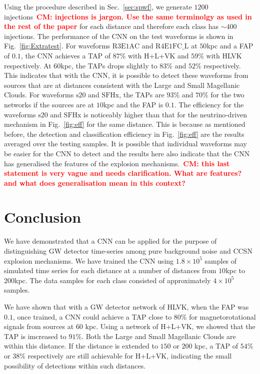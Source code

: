 \documentclass[aps,twocolumn,showpacs,groupedaddress, nofootinbib]{revtex4}  %
\newcommand{\cm}[1]{\textbf{\textcolor{red}{CM: #1}}}
\begin{document}
%
%
Using the procedure described in Sec.~\ref{sec:spwf}, we generate $1200$
injections~\cm{injections is jargon. Use the same terminolgy as used in the
rest of the paper} for each distance and therefore each class has $\sim 400$
injections. The performance of the \ac{CNN} on the test waveforms is shown in
Fig.~\ref{fig:Extratest}. For waveforms $\text{R3E1AC}$ and $\text{R4E1FC\_L}$
at $50$kpc and a \ac{FAP} of $0.1$, the \ac{CNN} achieves a \ac{TAP} of $87\%$
with H+L+VK and $59\%$ with HLVK respectively. At $60$kpc, the \acp{TAP} drops
slightly to $83\%$ and $52\%$ respectively. This indicates that with the
\ac{CNN}, it is possible to detect these waveforms from sources that are at
distances consistent with the Large and Small Magellanic Clouds. For waveforms
$\text{s}20$ and $\text{SFHx}$, the \acp{TAP} are $93\%$ and $70\%$ for the two
networks if the sources are at $10$kpc and the \ac{FAP} is $0.1$.  The
efficiency for the waveforms $\text{s}20$ and $\text{SFHx}$ is noticeably
higher than that for the neutrino-driven mechanism in Fig.~\ref{fig:eff} for
the same distance. This is because as mentioned before, the detection and
classification efficiency in Fig.~\ref{fig:eff} are the results averaged over
the testing samples. It is possible that individual waveforms may be easier for
the \ac{CNN} to detect and the results here also indicate that the \ac{CNN} has
generalised the features of the explosion mechanisms.~\cm{this last statement
is very vague and needs clarification. What are features? and what does
generalisation mean in this context?}

\section{Conclusion}\label{sec:conclusion}
%
%
We have demonstrated that a \ac{CNN} can be applied for the purpose of
distinguishing \ac{GW} detector time-series among pure background noise and
\ac{CCSN} explosion mechanisms. We have trained the \ac{CNN} using
$1.8\times10^{5}$ samples of simulated time series for each distance at a
number of distances from $10$kpc to $200$kpc. The data samples for each
class consisted of approximately $4\times10^5$ samples. 

%
%
We have shown that with a \ac{GW} detector network of HLVK, when the \ac{FAP}
was $0.1$, once trained, a \ac{CNN} could achieve a \ac{TAP} close to $80\%$
for magnetorotational signals from sources at $60$ kpc. Using a network of
H+L+VK, we showed that the \ac{TAP} is imcreased to $91\%$.  Both the Large and
Small Magellanic Clouds are within this distance. If the distance is extended
to $150$ or $200$ kpc, a \ac{TAP} of $54\%$ or $38\%$ respectively are still
achievable for H+L+VK, indicating the small possibility of detections within
such distances. 
\end{document}
